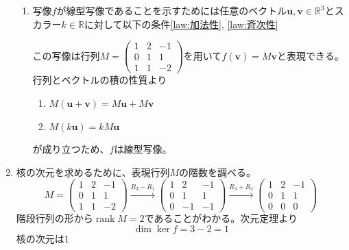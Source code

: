 \documentclass[dvipdfmx]{jsreport}
\newcommand{\R}{\mathbb{R}}
\DeclareMathOperator{\rank}{rank}
\newcounter{num}[section]
\begin{document}
\begin{answer}
\begin{enumerate}
\begin{enumerate_roman}
\end{enumerate_roman}
\begin{enumerate}
	\item 写像$f$が線型写像であることを示すためには任意のベクトル$\bm{u}, \bm{v}\in \R^3$とスカラー$k\in \R$に対して以下の条件\ref{law:加法性}, \ref{law:斉次性}
	この写像は行列$M= \begin{pmatrix}1& 2& -1\\ 0& 1& 1\\ 1& 1& -2\end{pmatrix}$を用いて$f(\bm{v})= M\bm{v}$と表現できる。行列とベクトルの積の性質より
\begin{enumerate}
	\item $M(\bm{u}+ \bm{v})= M\bm{u}+ M\bm{v}$
	\item $M(k\bm{u})= kM\bm{u}$
\end{enumerate}
	が成り立つため、$f$は線型写像。
\end{enumerate}
	\item 核の次元を求めるために、表現行列$M$の階数を調べる。
\begin{equation*}
	M= \begin{pmatrix}1& 2& -1\\ 0& 1& 1\\ 1& 1& -2\end{pmatrix}
\stackrel{R_3- R_1}{\longrightarrow} \begin{pmatrix}1& 2& -1\\ 0& 1& 1\\ 0& -1& -1\end{pmatrix}\stackrel{R_3+ R_2}{\longrightarrow}
\begin{pmatrix}1& 2& -1\\ 0& 1& 1\\ 0& 0& 0\end{pmatrix}
\end{equation*}
	階段行列の形から$\rank{M}= 2$であることがわかる。次元定理より
\begin{equation*}
	\dim{\ker{f}}= 3- 2= 1
\end{equation*}
	核の次元は1
\end{enumerate}
\end{answer}
\end{document}
